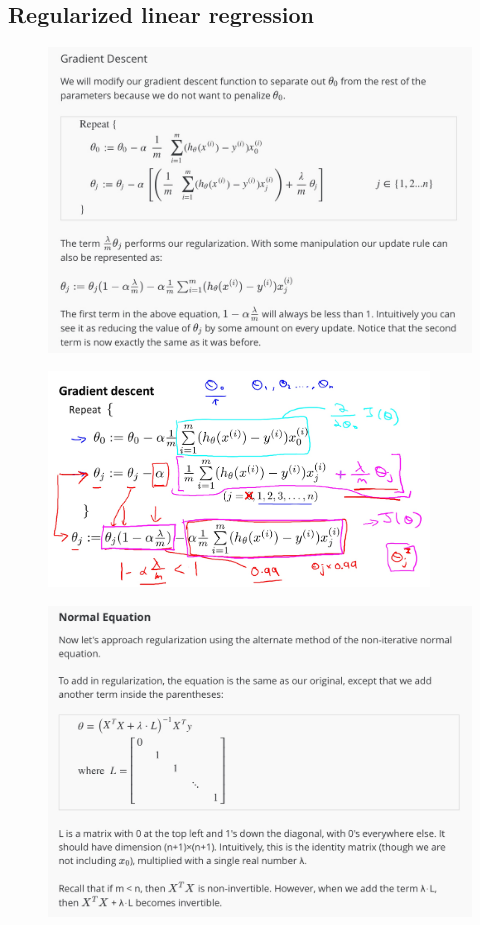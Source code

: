 \documentclass[12pt, A4,onecolumn]{article} %
\begin{document}
\subsection{Regularized linear regression}
\begin{figure}[H]
	\centering
	\includegraphics[width=1\textwidth]{./Imagenes/regulLinearReg1}
\end{figure}

\begin{figure}[H]
	\centering
	\includegraphics[width=0.9\textwidth]{./Imagenes/regulLinearReg2}
\end{figure}

\begin{figure}[H]
	\centering
	\includegraphics[width=1\textwidth]{./Imagenes/regulNormalEq1}
\end{figure}
\end{document}
